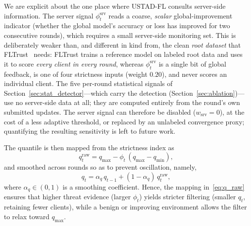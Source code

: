 \documentclass[journal]{IEEEtran}
\begin{document}
We are explicit about the one place where USTAD-FL consults server-side information. The server signal $\phi_t^{\mathrm{srv}}$ reads a coarse, \emph{scalar} global-improvement indicator (whether the global model's accuracy or loss has improved for two consecutive rounds), which requires a small server-side monitoring set. This is deliberately weaker than, and different in kind from, the clean \emph{root dataset} that FLTrust~\cite{cao2020fltrust} needs: FLTrust trains a reference model on labeled root data and uses it to score \emph{every client in every round}, whereas $\phi_t^{\mathrm{srv}}$ is a single bit of global feedback, is one of four strictness inputs (weight $0.20$), and never scores an individual client. The five per-round statistical signals of Section~\ref{sec:stat_detector}---which carry the detection (Section~\ref{sec:ablation})---use no server-side data at all; they are computed entirely from the round's own submitted updates. The server signal can therefore be disabled ($w_{\mathrm{srv}}=0$), at the cost of a less adaptive threshold, or replaced by an unlabeled convergence proxy; quantifying the resulting sensitivity is left to future work.

The quantile is then mapped from the strictness index as
\begin{equation}
q_t^{\mathrm{raw}} = q_{\max} - \phi_t\,(q_{\max} - q_{\min}),
\label{eq:q_raw}
\end{equation}
and smoothed across rounds so as to prevent oscillation, namely,
\begin{equation}
q_t = \alpha_q\, q_{t-1} + (1-\alpha_q)\, q_t^{\mathrm{raw}},
\label{eq:q_smooth}
\end{equation}
where $\alpha_q \in (0,1)$ is a smoothing coefficient. Hence, the mapping in~\eqref{eq:q_raw} ensures that higher threat evidence (larger $\phi_t$) yields stricter filtering (smaller $q_t$, retaining fewer clients), while a benign or improving environment allows the filter to relax toward $q_{\max}$.
\end{document}
